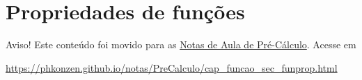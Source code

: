 



\section{Propriedades de funções}\label{cap_funcao_sec_funprop}

\begin{center}
  Aviso! Este conteúdo foi movido para as \href{https://phkonzen.github.io/notas/PreCalculo/main.html}{Notas de Aula de Pré-Cálculo}. Acesse em

  \url{https://phkonzen.github.io/notas/PreCalculo/cap_funcao_sec_funprop.html}
\end{center}




